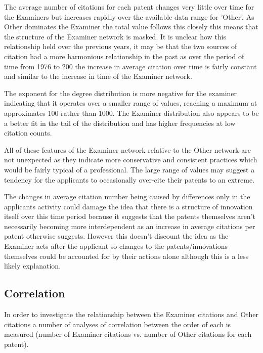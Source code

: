 The average number of citations for each patent changes very little over time for the Examiners but increases rapidly over the available data range for 'Other'. As Other dominates the Examiner the total value follows this closely this means that the structure of the Examiner network is masked. It is unclear how this relationship held over the previous years, it may be that the two sources of citation had a more harmonious relationship in the past as over the period of time from 1976 to 200 the increase in average citation over time is fairly constant and similar to the increase in time of the Examiner network. 

The exponent for the degree distribution is more negative for the examiner indicating that it operates over a smaller range of values, reaching a maximum at approximates 100 rather than 1000. The Examiner distribution also appears to be a better fit in the tail of the distribution and has higher frequencies at low citation counts. 

All of these features of the Examiner network relative to the Other network are not unexpected as they indicate more conservative and consistent practices which would be fairly typical of a professional. The large range of values may suggest a tendency for the applicants to occasionally over-cite their patents to an extreme. 

The changes in average citation number being caused by differences only in the applicants activity could damage the idea that there is a structure of innovation itself over this time period because it suggests that the patents themselves aren't necessarily becoming more interdependent as an increase in average citations per patent otherwise suggests. However this doesn't discount the idea as the Examiner acts after the applicant so changes to the patents/innovations themselves could be accounted for by their actions alone although this is a less likely explanation. 


\subsection{Correlation} \label{Correlation}

In order to investigate the relationship between the Examiner citations and Other citations a number of analyses of correlation between the order of each is measured (number of Examiner citations vs. number of Other citations for each patent). 

